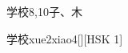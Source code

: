 \begin{entry}{学校}{8,10}{⼦、⽊}
  \begin{phonetics}{学校}{xue2xiao4}[][HSK 1]
  \end{phonetics}
\end{entry}
